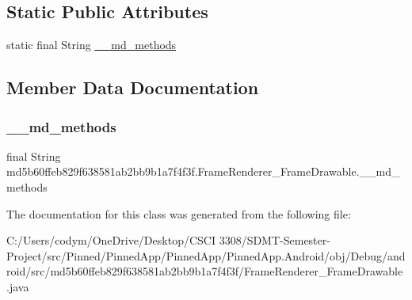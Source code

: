 \subsection*{Static Public Attributes}
\begin{DoxyCompactItemize}
\item 
static final String \hyperlink{classmd5b60ffeb829f638581ab2bb9b1a7f4f3f_1_1_frame_renderer___frame_drawable_acfbbaabd3b64c552efa12d5d5b5d7e8b}{\+\_\+\+\_\+md\+\_\+methods}
\end{DoxyCompactItemize}


\subsection{Member Data Documentation}
\mbox{\label{classmd5b60ffeb829f638581ab2bb9b1a7f4f3f_1_1_frame_renderer___frame_drawable_acfbbaabd3b64c552efa12d5d5b5d7e8b}} 
\subsubsection{\texorpdfstring{\+\_\+\+\_\+md\+\_\+methods}{\_\_md\_methods}}
{\footnotesize\ttfamily final String md5b60ffeb829f638581ab2bb9b1a7f4f3f.\+Frame\+Renderer\+\_\+\+Frame\+Drawable.\+\_\+\+\_\+md\+\_\+methods\hspace{0.3cm}{\ttfamily [static]}}



The documentation for this class was generated from the following file\+:\begin{DoxyCompactItemize}
\item 
C\+:/\+Users/codym/\+One\+Drive/\+Desktop/\+C\+S\+C\+I 3308/\+S\+D\+M\+T-\/\+Semester-\/\+Project/src/\+Pinned/\+Pinned\+App/\+Pinned\+App/\+Pinned\+App.\+Android/obj/\+Debug/android/src/md5b60ffeb829f638581ab2bb9b1a7f4f3f/Frame\+Renderer\+\_\+\+Frame\+Drawable.\+java\end{DoxyCompactItemize}

